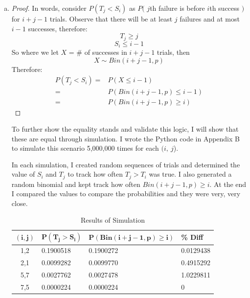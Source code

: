 \documentclass[11pt]{extarticle}
\begin{document}
\begin{enumerate}[(a)]
\item \begin{proof}

In words, consider $P(T_j < S_i)$ as $P($ $j$th failure is before $i$th success $)$ for $i+j-1$ trials. Observe that there will be at least $j$ failures and at most $i-1$ successes, therefore:
$$T_j \geq j$$ $$S_i \leq i-1$$
So where we let $X$ = \# of successes in $i+j-1$ trials, then $$X \sim Bin(i+j-1, p)$$
Therefore:  \begin{align*} 
P(T_j < S_i) = & P(X \leq i-1) \\
= & P(Bin(i+j-1, p) \leq i-1) \\
= & P( Bin(i+j-1, p) \geq i)  \end{align*} \end{proof} To further show the equality stands and validate this logic, I will show that these are equal through simulation. I wrote the Python code in Appendix B to simulate this scenario 5,000,000 times for each  $(i,\ j $).

In each simulation, I created random sequences of trials and determined the value of $S_i$ and $T_j$ to track how often $T_j > T_i$ was true. I also generated a random binomial  and kept track how often $Bin(i+j-1, p) \geq i$. At the end I compared the values to compare the probabilities and they were very, very close.






 \begin{table}[H]
\caption{Results of Simulation}
\centering
\begin{tabular}{clll}
\toprule
$\mathbf{(i,j)}$ & $\mathbf{P(T_j > S_i)}$ & $\mathbf{P(Bin(i+j-1,p) \geq i)}$ & \textbf{\% Diff}  \\
\midrule
1,2	&	0.1900518	&	0.1900272	&	0.0129438	\\
2,1	&	0.0099282	&	0.0099770	&	0.4915292	\\
5,7	&	0.0027762	&	0.0027478	&	1.0229811	\\
7,5	&	0.0000224	&	0.0000224	&	0	\\
\bottomrule
\end{tabular}
\end{table}


\end{enumerate}
\end{document}
